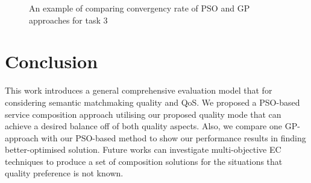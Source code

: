 \documentclass{IEEEtran}
\begin{document}
\begin{figure}[h]
\centering
{}
 \caption{An example of comparing convergency rate of PSO and GP approaches for task 3}
 \label{psovsgp}
\end{figure}



\section{Conclusion}\label{conclusion}
This work introduces a general comprehensive evaluation model that for considering semantic matchmaking quality and QoS. We proposed a PSO-based service composition approach utilising our proposed quality mode that can achieve a desired balance off of both quality aspects. Also, we compare one GP-approach with our PSO-based method to show our performance results in finding better-optimised solution. Future works can investigate multi-objective EC techniques to produce a set of composition solutions for the situations that quality preference is not known.




\end{document}
